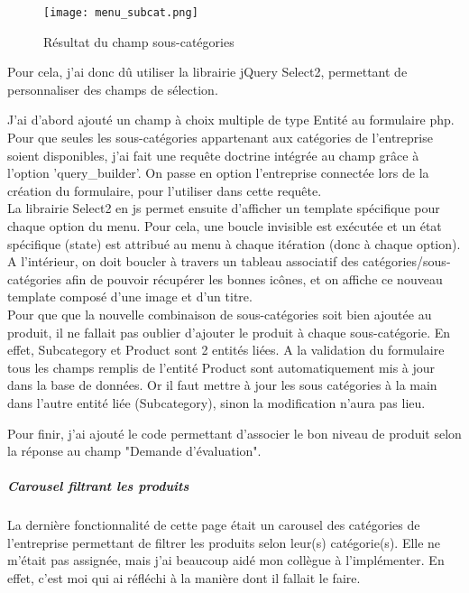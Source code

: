 \begin{figure}[H]
    \texttt{[image: menu\_subcat.png]}
    \caption{Résultat du champ sous-catégories}
\end{figure}

Pour cela, j'ai donc dû utiliser la librairie jQuery Select2, permettant de personnaliser des champs de sélection.

J'ai d'abord ajouté un champ à choix multiple de type Entité au formulaire php. 
Pour que seules les sous-catégories appartenant aux catégories de l'entreprise soient disponibles, j'ai fait une requête doctrine intégrée au champ grâce à l'option 'query\_builder'. 
On passe en option l'entreprise connectée lors de la création du formulaire, pour l'utiliser dans cette requête.\\


La librairie Select2 en js permet ensuite d'afficher un template spécifique pour chaque option du menu.
Pour cela, une boucle invisible est exécutée et un état spécifique (state) est attribué au menu à chaque itération (donc à chaque option).
A l'intérieur, on doit boucler à travers un tableau associatif des catégories/sous-catégories afin de pouvoir récupérer les bonnes icônes, et on affiche ce nouveau template composé d'une image et d'un titre.\\

Pour que que la nouvelle combinaison de sous-catégories soit bien ajoutée au produit, il ne fallait pas oublier d'ajouter le produit à chaque sous-catégorie.
En effet, Subcategory et Product sont 2 entités liées. A la validation du formulaire tous les champs remplis de l'entité Product sont automatiquement mis à jour dans la base de données.
Or il faut mettre à jour les sous catégories à la main dans l'autre entité liée (Subcategory), sinon la modification n'aura pas lieu.

Pour finir, j'ai ajouté le code permettant d'associer le bon niveau de produit selon la réponse au champ "Demande d'évaluation".

\subparagraph{Carousel filtrant les produits}

La dernière fonctionnalité de cette page était un carousel des catégories de l'entreprise permettant de filtrer les produits selon leur(s) catégorie(s).
Elle ne m'était pas assignée, mais j'ai beaucoup aidé mon collègue à l'implémenter. En effet, c'est moi qui ai réfléchi à la manière dont il fallait le faire.

